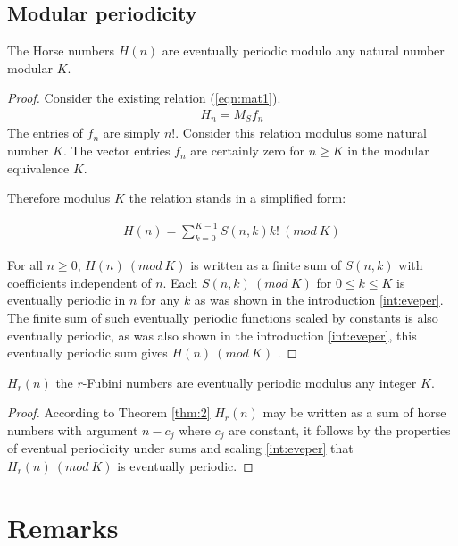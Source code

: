 \documentclass[12pt,reqno]{article}
\begin{document}
\subsection{Modular periodicity}
\begin{proposition}
The Horse numbers $H(n)$ are eventually periodic modulo any natural number modular $K$.

\begin{proof}
	Consider the existing relation (\ref{eqn:mat1}).
	\begin{align}
		H_{n} = M_{S}f_{n}\nonumber
	\end{align}
	The entries of $f_{n}$ are simply $n!$. Consider this relation modulus some natural number $K$. The vector entries $f_{n}$ are certainly zero for $n \geq K$ in the modular equivalence $K$.
	
	Therefore modulus $K$ the relation stands in a simplified form:
	
	\begin{align}
		H(n) = \sum_{k = 0}^{K - 1} S(n,k) k! ~{} (mod ~{} K)
	\end{align}

	For all $n \geq 0$, $H(n)~{} (mod ~{} K)$ is written as a finite sum of $S(n,k)$ with coefficients independent of $n$. Each $S(n,k) ~{} (mod~{} K)$ for $0 \leq k \leq K$ is eventually periodic in $n$ for any $k$ as was shown in the introduction \ref{int:eveper}. The finite sum of such eventually periodic functions scaled by constants is also eventually periodic, as was also shown in the introduction \ref{int:eveper}, this eventually periodic sum gives $H(n)~{} (mod ~{} K)$ .

\end{proof}
\end{proposition}

\begin{corollary}
	$H_{r}(n)$ the $r$-Fubini numbers are eventually periodic modulus any integer $K$.
	
	\begin{proof}
		According to Theorem \ref{thm:2} $H_{r}(n)$ may be written as a sum of horse numbers with argument $n - c_{j}$ where $c_{j}$ are constant, it follows by the properties of eventual periodicity under sums and scaling \ref{int:eveper} that $H_{r}(n) ~{}(mod ~{} K)$ is eventually periodic.
	\end{proof} 
\end{corollary}

\section{Remarks}
\end{document}
